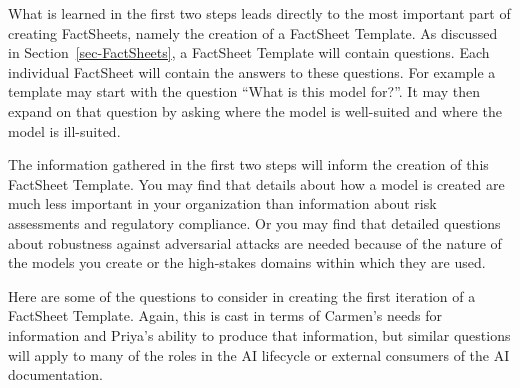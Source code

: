 \documentclass[11pt,dvipdfm]{article}
\begin{document}
What is learned in the first two steps leads directly to the most important part of creating FactSheets, namely the creation of a FactSheet Template. As discussed in Section~\ref{sec-FactSheets}, a FactSheet Template will contain questions. Each individual FactSheet will contain the answers to these questions. For example a template may start with the question ``What is this model for?''. It may then expand on that question by asking where the model is well-suited and where the model is ill-suited.

The information gathered in the first two steps will inform the creation of this FactSheet Template. You may find that details about how a model is created are much less important in your organization than information about risk assessments and regulatory compliance. Or you may find that detailed questions about robustness against adversarial attacks are needed because of the nature of the models you create or the high-stakes domains within which they are used.

Here are some of the questions to consider in creating the first iteration of a FactSheet Template. Again, this is cast in terms of Carmen's needs for information and Priya's ability to produce that information, but similar questions will apply to many of the roles in the AI lifecycle
or external consumers of the AI documentation.\\
\end{document}
